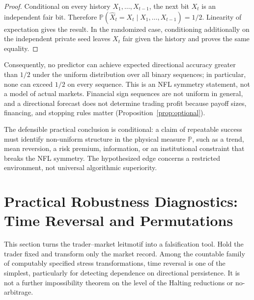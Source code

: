 \documentclass[aps,pra,reprint,superscriptaddress,amsmath,amssymb,floatfix]{revtex4-2}
\theoremstyle{plain}
\theoremstyle{definition}
\theoremstyle{remark}
\begin{document}
\begin{proof}
Conditional on every history \(X_1,\ldots,X_{t-1}\), the next bit \(X_t\) is
an independent fair bit. Therefore
\(\mathbb{P}(\widehat X_t=X_t\mid X_1,\ldots,X_{t-1})=1/2\).
Linearity of expectation gives the result. In the randomized case, conditioning
additionally on the independent private seed leaves \(X_t\) fair given the
history and proves the same equality.
\end{proof}

Consequently, no predictor can achieve expected directional accuracy greater
than \(1/2\) under the uniform distribution over all binary sequences; in
particular, none can exceed \(1/2\) on every sequence. This is an NFL symmetry
statement, not a model of actual markets. Financial sign sequences are not
uniform in general, and a directional forecast does not determine trading
profit because payoff sizes, financing, and stopping rules matter
(Proposition~\ref{prop:optional}).

The defensible practical conclusion is conditional: a claim of repeatable
success must identify non-uniform structure in the physical measure
\(\mathbb{P}\), such as a trend, mean reversion, a risk premium, information,
or an institutional constraint that breaks the NFL symmetry. The hypothesized
edge concerns a restricted environment, not universal algorithmic
superiority.

\section{Practical Robustness Diagnostics: Time Reversal and Permutations}
\label{sec:criterion}

This section turns the trader--market leitmotif into a falsification tool. Hold
the trader fixed and transform only the market record. Among the countable
family of computably specified stress transformations, time reversal is one of
the simplest, particularly for detecting dependence on directional
persistence. It is not a further impossibility theorem on the level of the
Halting reductions or no-arbitrage.
\end{document}
